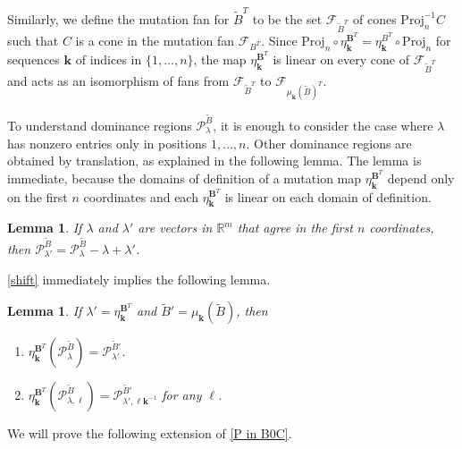 \documentclass{amsart}
\newtheorem{lemma}[proposition]{Lemma}
\theoremstyle{definition}
\theoremstyle{remark}
\numberwithin{equation}{section}
\newcommand{\reals}{\mathbb R}
\newcommand{\set}[1]{{\lbrace #1 \rbrace}}
\newcommand{\F}{{\mathcal F}}
\newcommand{\0}{{\mathbf{0}}}
\newcommand{\Proj}{\mathrm{Proj}}
\newcommand{\kk}{\mathbf{k}}
\renewcommand{\ll}{{\boldsymbol\ell}}
\newcommand{\tB}{{\tilde{B}}}
\newcommand{\BB}{\mathbf{B}}
\renewcommand{\P}{\mathcal{P}}
\begin{document}
Similarly, we define the mutation fan for $\tB^T$ to be the set $\F_{\tB^T}$ of cones $\Proj_n^{-1}C$ such that $C$ is a cone in the mutation fan $\F_{B^T}$.
Since $\Proj_n\circ\eta_\kk^{\BB^T}=\eta_\kk^{B^T}\circ\Proj_n$ for sequences $\kk$ of indices in $\set{1,\ldots,n}$, the map $\eta_\kk^{\BB^T}$ is linear on every cone of $\F_{\tB^T}$ and acts as an isomorphism of fans from $\F_{\tB^T}$ to $\F_{\mu_\kk(\tB)^T}$.

To understand dominance regions $\P^\tB_\lambda$, it is enough to consider the case where $\lambda$ has nonzero entries only in positions $1,\ldots,n$.
Other dominance regions are obtained by translation, as explained in the following lemma.
The lemma is immediate, because the domains of definition of a mutation map $\eta_\kk^{\BB^T}$ depend only on the first $n$ coordinates and each $\eta_\kk^{\BB^T}$ is linear on each domain of definition.
\begin{lemma}\label{after all coefficients are just coefficients}
If $\lambda$ and $\lambda'$ are vectors in $\reals^m$ that agree in the first $n$ coordinates, then $\P^\tB_{\lambda'}=\P^\tB_\lambda-\lambda+\lambda'$.
\end{lemma}

\cref{shift} immediately implies the following lemma.
\begin{lemma}\label{shift extended}
If $\lambda'=\eta^{\BB^T}_\kk$ and $\tB'=\mu_\kk(\tB)$, then 
\begin{enumerate}[\quad\bf1.]
\item \label{shift extended all}
$\eta^{\BB^T}_\kk\!\!(\P^\tB_\lambda)=\P^{\tB'}_{\lambda'}$.
\item \label{shift extended one}
$\eta^{\BB^T}_\kk\!\!(\P^\tB_{\lambda,\ll})=\P^{\tB'}_{\lambda',\ll\kk^{-1}}$ for any $\ll$.
\end{enumerate}
\end{lemma}

We will prove the following extension of \cref{P in B0C}.
\end{document}
